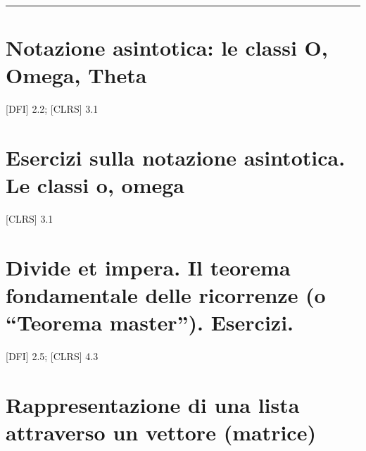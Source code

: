 \documentclass{article}
\begin{document}
{{{\begin{center}\rule{0.5\linewidth}{\linethickness}\end{center}

\section{\texorpdfstring{{}}{}}\label{h.t0xc4p18h6wu}

\hypertarget{h.jkxlloc1lefg}{\section{\texorpdfstring{{Notazione
asintotica: le classi O, Omega, Theta
}}{Notazione asintotica: le classi O, Omega, Theta }}\label{h.jkxlloc1lefg}}

{{[}DFI{]} 2.2; {[}CLRS{]} 3.1}

{}

{}

{}

\hypertarget{h.tn5j57miv2l8}{\section{\texorpdfstring{{Esercizi sulla
notazione asintotica. Le classi o,
omega}}{Esercizi sulla notazione asintotica. Le classi o, omega}}\label{h.tn5j57miv2l8}}

{{[}CLRS{]} 3.1}

{}

{}

\hypertarget{h.qp9ilz1tito1}{\section{\texorpdfstring{{Divide et impera.
Il teorema fondamentale delle ricorrenze (o ``Teorema master'').
Esercizi.}}{Divide et impera. Il teorema fondamentale delle ricorrenze (o Teorema master). Esercizi.}}\label{h.qp9ilz1tito1}}

{{[}DFI{]} 2.5; {[}CLRS{]} 4.3}

{}

{}

{}

\hypertarget{h.a5tr7osf4zwh}{\section{\texorpdfstring{{Rappresentazione
di una lista attraverso un vettore
(matrice)}}{Rappresentazione di una lista attraverso un vettore (matrice)}}\label{h.a5tr7osf4zwh}}

}}}
\end{document}

